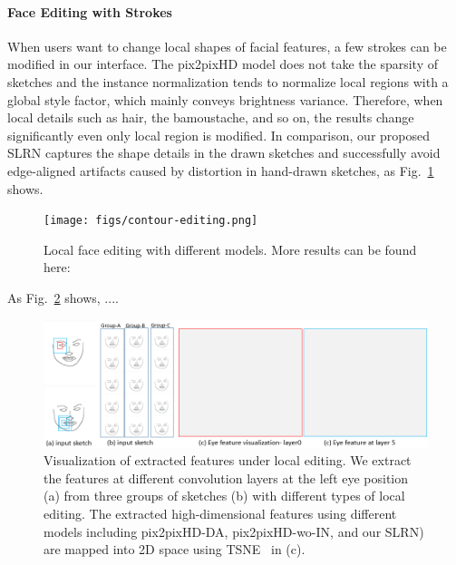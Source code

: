 \paragraph{Face Editing with Strokes} When users want to change local shapes of facial features, a few strokes can be modified in our interface. 
The pix2pixHD model does not take the sparsity of sketches and the instance normalization tends to normalize local regions with a global style factor, which mainly conveys brightness variance. Therefore, when local details such as hair, the bamoustache, and so on, the results change significantly even only local region is modified. 
In comparison, our proposed SLRN captures the shape details in the drawn sketches and successfully avoid edge-aligned artifacts caused by distortion in hand-drawn sketches, as Fig.~\ref{fig:cmp-contour-editing} shows.

\begin{figure}
	\centering
	\texttt{[image: figs/contour-editing.png]}
	\caption{Local face editing with different models.  More results can be found here:  }
	\label{fig:cmp-contour-editing}
\end{figure}



As Fig.~\ref{fig:vis-feature-slpn} shows, ....

\begin{figure} 
	\centering
	\includegraphics[width=2\columnwidth]{figs/slrnFeature.png}
	\caption{Visualization of extracted features under local editing. We extract the features at different convolution layers at the left eye position (a) from three groups of sketches (b) with different types of local editing. The extracted high-dimensional features using different models including pix2pixHD-DA, pix2pixHD-wo-IN, and our SLRN) are mapped into 2D space using TSNE~\cite{tsne} in (c).  } 
	\label{fig:vis-feature-slpn}	
\end{figure}